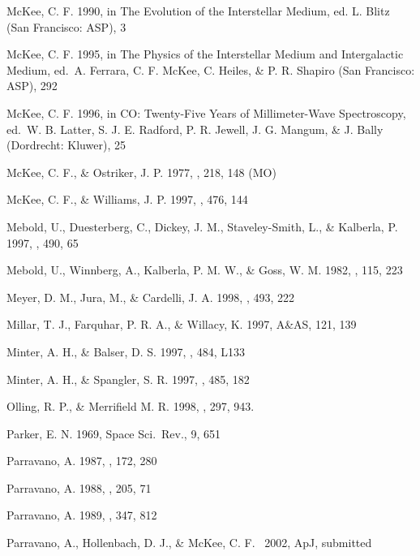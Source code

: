 \documentclass[12pt,preprint,flushrt]{aastex}
\begin{document}
\begin{thebibliography}{}
McKee, C. F. 1990, in The Evolution of the Interstellar
Medium, ed. L. Blitz (San Francisco: ASP), 3

McKee, C. F. 1995, in The Physics of the Interstellar
Medium and Intergalactic Medium, ed.\ A. Ferrara, C. F. McKee, C. Heiles,
\& P. R. Shapiro (San Francisco: ASP), 292

McKee, C. F. 1996, in CO: Twenty-Five Years
of Millimeter-Wave Spectroscopy, ed.\ W. B. Latter, S. J. E. Radford,
P. R. Jewell, J. G. Mangum, \& J. Bally  (Dordrecht: Kluwer), 25

McKee, C. F., \& Ostriker, J. P.
1977, \apj, 218, 148 (MO)

McKee, C. F., \& Williams, J. P.
1997, \apj, 476, 144

Mebold, U., Duesterberg, C., Dickey,
J. M., Staveley-Smith, L., \& Kalberla, P. 1997, \apj, 490, 65

Mebold, U., Winnberg, A., Kalberla,
P. M. W., \& Goss, W. M. 1982, \aap, 115, 223

Meyer, D. M., Jura, M.,
\& Cardelli, J. A. 1998, \apj, 493, 222

Millar, T. J., Farquhar, P. R. A.,
\& Willacy, K. 1997, A\&AS, 121, 139

Minter, A. H., \& Balser, D. S. 
1997, \apj, 484, L133

 Minter, A. H., \& Spangler, S. R.
1997, \apj, 485, 182

Olling, R. P., \& Merrifield
M. R. 1998, \mnras, 297, 943.

Parker, E. N. 1969, Space Sci.\ Rev., 9, 651

Parravano, A. 1987, \aap, 172, 280

Parravano, A. 1988, \aap, 205, 71

Parravano, A. 1989, \apj, 347, 812

Parravano, A.,
Hollenbach, D. J., \& McKee, C. F.  \ 2002, ApJ, submitted


\end{thebibliography}
\end{document}
